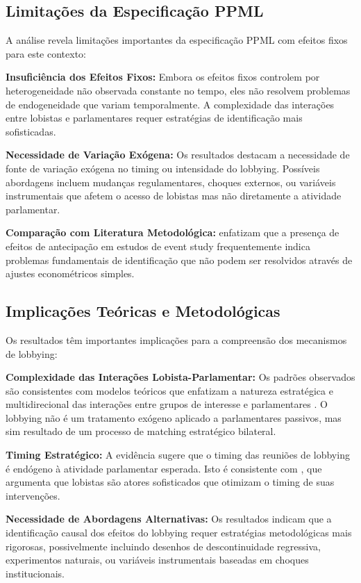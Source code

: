 \subsection{Limitações da Especificação PPML}

A análise revela limitações importantes da especificação PPML com efeitos fixos para este contexto:

\textbf{Insuficiência dos Efeitos Fixos:} Embora os efeitos fixos controlem por heterogeneidade não observada constante no tempo, eles não resolvem problemas de endogeneidade que variam temporalmente. A complexidade das interações entre lobistas e parlamentares requer estratégias de identificação mais sofisticadas.

\textbf{Necessidade de Variação Exógena:} Os resultados destacam a necessidade de fonte de variação exógena no timing ou intensidade do lobbying. Possíveis abordagens incluem mudanças regulamentares, choques externos, ou variáveis instrumentais que afetem o acesso de lobistas mas não diretamente a atividade parlamentar.

\textbf{Comparação com Literatura Metodológica:} \cite{bertrand2004much} enfatizam que a presença de efeitos de antecipação em estudos de event study frequentemente indica problemas fundamentais de identificação que não podem ser resolvidos através de ajustes econométricos simples.

\subsection{Implicações Teóricas e Metodológicas}

Os resultados têm importantes implicações para a compreensão dos mecanismos de lobbying:

\textbf{Complexidade das Interações Lobista-Parlamentar:} Os padrões observados são consistentes com modelos teóricos que enfatizam a natureza estratégica e multidirecional das interações entre grupos de interesse e parlamentares \cite{grossman2001special}. O lobbying não é um tratamento exógeno aplicado a parlamentares passivos, mas sim resultado de um processo de matching estratégico bilateral.

\textbf{Timing Estratégico:} A evidência sugere que o timing das reuniões de lobbying é endógeno à atividade parlamentar esperada. Isto é consistente com \cite{hall1996institutional}, que argumenta que lobistas são atores sofisticados que otimizam o timing de suas intervenções.

\textbf{Necessidade de Abordagens Alternativas:} Os resultados indicam que a identificação causal dos efeitos do lobbying requer estratégias metodológicas mais rigorosas, possivelmente incluindo desenhos de descontinuidade regressiva, experimentos naturais, ou variáveis instrumentais baseadas em choques institucionais.

